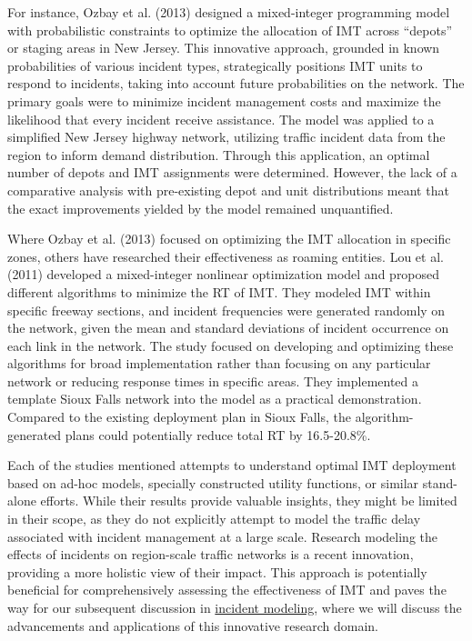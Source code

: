 \documentclass[fancy, oneside, mastersfancy, ms]{byuthesis}
\begin{document}
For instance, Ozbay et al. (2013) designed a mixed-integer programming
model with probabilistic constraints to optimize the allocation of IMT
across ``depots'' or staging areas in New Jersey. This innovative
approach, grounded in known probabilities of various incident types,
strategically positions IMT units to respond to incidents, taking into
account future probabilities on the network. The primary goals were to
minimize incident management costs and maximize the likelihood that
every incident receive assistance. The model was applied to a simplified
New Jersey highway network, utilizing traffic incident data from the
region to inform demand distribution. Through this application, an
optimal number of depots and IMT assignments were determined. However,
the lack of a comparative analysis with pre-existing depot and unit
distributions meant that the exact improvements yielded by the model
remained unquantified.

Where Ozbay et al. (2013) focused on optimizing the IMT allocation in
specific zones, others have researched their effectiveness as roaming
entities. Lou et al. (2011) developed a mixed-integer nonlinear
optimization model and proposed different algorithms to minimize the RT
of IMT. They modeled IMT within specific freeway sections, and incident
frequencies were generated randomly on the network, given the mean and
standard deviations of incident occurrence on each link in the network.
The study focused on developing and optimizing these algorithms for
broad implementation rather than focusing on any particular network or
reducing response times in specific areas. They implemented a template
Sioux Falls network into the model as a practical demonstration.
Compared to the existing deployment plan in Sioux Falls, the
algorithm-generated plans could potentially reduce total RT by
16.5-20.8\%.

Each of the studies mentioned attempts to understand optimal IMT
deployment based on ad-hoc models, specially constructed utility
functions, or similar stand-alone efforts. While their results provide
valuable insights, they might be limited in their scope, as they do not
explicitly attempt to model the traffic delay associated with incident
management at a large scale. Research modeling the effects of incidents
on region-scale traffic networks is a recent innovation, providing a
more holistic view of their impact. This approach is potentially
beneficial for comprehensively assessing the effectiveness of IMT and
paves the way for our subsequent discussion in
\protect\hyperlink{sec-inc_modeling}{incident modeling}, where we will
discuss the advancements and applications of this innovative research
domain.
\end{document}
